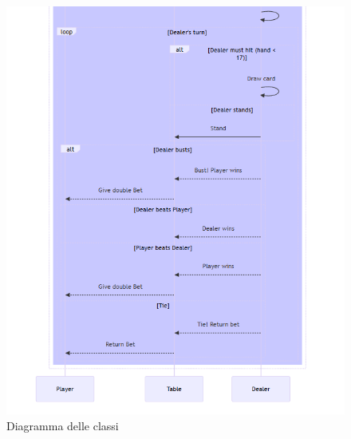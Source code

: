 \begin{figure}[!htb]
    \centering
    \includegraphics[scale=0.55]{report/img/sequenceDiagram2.png}
    \caption{Diagramma delle classi}
    \label{fig:classDiagram}
\end{figure}

